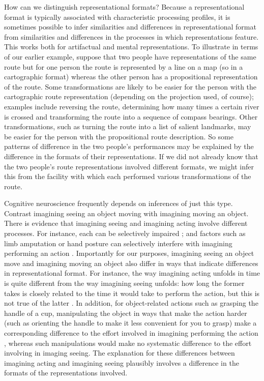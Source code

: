 \documentclass[12pt,\papersize]{extarticle}
\begin{document}
How can we distinguish representational formats? Because a representational format is typically associated with characteristic processing profiles, it is sometimes possible to infer similarities and differences in representational format from similarities and differences in the processes in which representations feature. This works both for artifactual and mental representations.  To illustrate in terms of our earlier example, suppose that two people have representations of the same route but for one person the route is represented by a line on a map (so in a cartographic format) whereas the other person has a propositional representation of the route. Some transformations are likely to be easier for the person with the cartographic route representation (depending on the projection used, of course); examples include reversing the route, determining how many times a certain river is crossed and transforming the route into a sequence of compass bearings. Other transformations, such as turning the route into a list of salient landmarks, may be easier for the person with the propositional route description. So some patterns of difference in the two people's performances may be explained by the difference in the formats of their representations. If we did not already know that the two people's route representations involved different formats, we might infer this from the facility with which each performed various transformations of the route. 

Cognitive neuroscience frequently depends on inferences of just this type. Contrast imagining seeing an object moving with imagining moving an object. There is evidence that imagining seeing and imagining acting involve different processes. For instance, each can be selectively impaired \citep{sirigu:2011_motor}; and factors such as limb amputation or hand posture can selectively interfere with imagining performing an action \citep{nico:2004_left,vargas:2004s_influence,fourkas:2006_influence}. Importantly for our purposes, imagining seeing an object move and imagining moving an object also differ in ways that indicate differences in representational format. For instance, the way imagining acting unfolds in time is quite different from the way imagining seeing unfolds: how long the former takes is closely related to the time it would take to perform the action, but this is not true of the latter \citep{decety:1989_timing,decety:1996_imagined,Jeannerod:1994oz}. In addition, for object-related actions such as grasping the handle of a cup, manipulating the object in ways that make the action harder (such as orienting the handle to make it less convenient for you to grasp) make a corresponding difference to the effort involved in imagining performing the action \citep{parsons:1994_temporal,frak:2001_orientation}, whereas such manipulations would make no systematic difference to the effort involving in imaging seeing. The explanation for these differences between imagining acting and imagining seeing plausibly involves a difference in the formats of the representations involved.  
\end{document}
